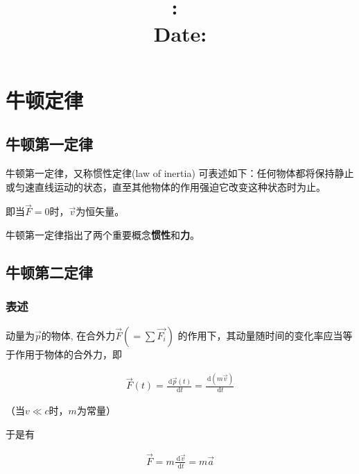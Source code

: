 \documentclass[12pt, a4paper]{article}
\title{
    \vspace{2in}
    \textmd{\textbf{\hmwkClass:\ \hmwkTitle}}\\
    \normalsize\vspace{0.1in}\small{Date: \hmwkDueDate}\\
    \vspace{0.1in}\large{\textit{\myUniversiy}}
    \vspace{3in}
}
\author{\hmwkAuthorName}
\date{}
\numberwithin{equation}{section}
\newcommand{\rmd}{\mathrm{~d}}
\newcommand{\deriv}[2]{\frac{\rmd #1}{\rmd #2}}
\begin{document}
\maketitle

\pagebreak


\tableofcontents

\pagebreak


\pagebreak

\section{牛顿定律}

\subsection{牛顿第一定律}

    牛顿第一定律，又称惯性定律(law of inertia) 可表述如下：任何物体都将保持静止
    或匀速直线运动的状态，直至其他物体的作用强迫它改变这种状态时为止。

    即当\(\overrightarrow{F} = 0\)时，\(\overrightarrow{v}\)为恒矢量。

    牛顿第一定律指出了两个重要概念\textbf{惯性}和\textbf{力}。

\subsection{牛顿第二定律}

\subsubsection{表述}

    动量为\(\overrightarrow{p}\)的物体, 在合外力\(\overrightarrow{F} \left(=\sum \overrightarrow{F_{i}}\right)\)
    的作用下，其动量随时间的变化率应当等于作用于物体的合外力，即

    \begin{align}
        \overrightarrow{F}\left(t\right) = \deriv{\overrightarrow{p}\left(t\right)}{t} =
        \deriv{\left(m\overrightarrow{v}\right)}{t}
    \end{align}

    （当\(v\ll c\)时，\(m\)为常量）

    于是有

    \begin{align}
        \overrightarrow{F} = m \deriv{\overrightarrow{v}}{t} = m \overrightarrow{a}
    \end{align}
\end{document}
